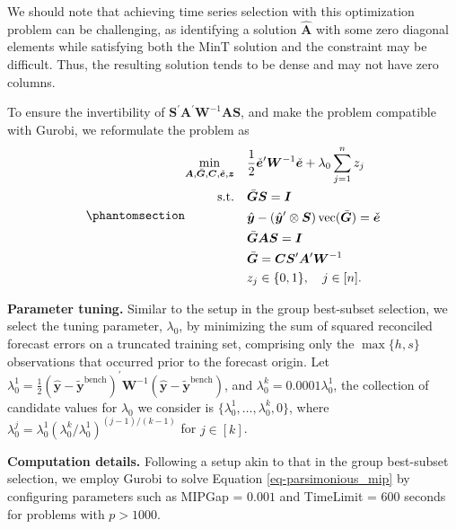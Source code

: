 \documentclass[
  11pt]{article}
\theoremstyle{plain}
\theoremstyle{remark}
\begin{document}
We should note that achieving time series selection with this
optimization problem can be challenging, as identifying a solution
\(\hat{\bm{A}}\) with some zero diagonal elements while satisfying both
the MinT solution and the constraint may be difficult. Thus, the
resulting solution tends to be dense and may not have zero columns.

To ensure the invertibility of
\(\bm{S}^{\prime}\bm{A}^{\prime}\bm{W}^{-1}\bm{A}\bm{S}\), and make the
problem compatible with Gurobi, we reformulate the problem as
\begin{equation}\phantomsection\label{eq-parsimonious_mip}{
\begin{aligned}
\min_{\bm{A},\bar{\bm{G}},\bm{C},\check{\bm{e}},\bm{z}} \quad & \frac{1}{2}\check{\bm{e}}^{\prime} \bm{W}^{-1}\check{\bm{e}} + \lambda_0 \sum_{j=1}^n z_j \\
\text{s.t.} \quad & \bar{\bm{G}}\bm{S} = \bm{I} \\
& \hat{\bm{y}}-\left(\hat{\bm{y}}^{\prime} \otimes \bm{S}\right)\operatorname{vec}(\bar{\bm{G}}) = \check{\bm{e}} \\
& \bar{\bm{G}}\bm{A}\bm{S} = \bm{I} \\
& \bar{\bm{G}} = \bm{C}\bm{S}^{\prime}\bm{A}^{\prime}\bm{W}^{-1} \\
& z_j \in\{0,1\}, \quad j \in[n].
\end{aligned}
}\end{equation}

\textbf{Parameter tuning.} Similar to the setup in the group best-subset
selection, we select the tuning parameter, \(\lambda_0\), by minimizing
the sum of squared reconciled forecast errors on a truncated training
set, comprising only the \(\max\{h, s\}\) observations that occurred
prior to the forecast origin. Let
\(\lambda_{0}^{1} = \frac{1}{2}\left(\hat{\bm{y}}-\tilde{\bm{y}}^{\text{bench}}\right)^{\prime} \bm{W}^{-1}\left(\hat{\bm{y}}-\tilde{\bm{y}}^{\text{bench}}\right)\),
and \(\lambda_{0}^{k} = 0.0001\lambda_{0}^{1}\), the collection of
candidate values for \(\lambda_0\) we consider is
\(\{\lambda_{0}^{1},\dots,\lambda_{0}^{k}, 0\}\), where
\(\lambda_{0}^{j} = \lambda_{0}^{1}\left(\lambda_{0}^{k} / \lambda_{0}^{1}\right)^{(j-1) / (k-1)}\)
for \(j \in [k]\).

\textbf{Computation details.} Following a setup akin to that in the
group best-subset selection, we employ Gurobi to solve Equation
\eqref{eq-parsimonious_mip} by configuring parameters such as MIPGap =
\(0.001\) and TimeLimit = \(600\) seconds for problems with
\(p > 1000\).
\end{document}
